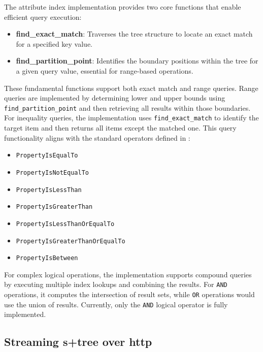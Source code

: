 The attribute index implementation provides two core functions that enable efficient query execution:

\begin{itemize}
  \item \textbf{find\_exact\_match}: Traverses the tree structure to locate an exact match for a specified key value.
  \item \textbf{find\_partition\_point}: Identifies the boundary positions within the tree for a given query value, essential for range-based operations.
\end{itemize}

These fundamental functions support both exact match and range queries. Range queries are implemented by determining lower and upper bounds using \texttt{find\_partition\_point} and then retrieving all results within those boundaries. For inequality queries, the implementation uses \texttt{find\_exact\_match} to identify the target item and then returns all items except the matched one. This query functionality aligns with the standard operators defined in \citet{ogc_filter_encoding_2010}:

\begin{itemize}
  \item \texttt{PropertyIsEqualTo}
  \item \texttt{PropertyIsNotEqualTo}
  \item \texttt{PropertyIsLessThan}
  \item \texttt{PropertyIsGreaterThan}
  \item \texttt{PropertyIsLessThanOrEqualTo}
  \item \texttt{PropertyIsGreaterThanOrEqualTo}
  \item \texttt{PropertyIsBetween}
\end{itemize}

For complex logical operations, the implementation supports compound queries by executing multiple index lookups and combining the results. For \texttt{AND} operations, it computes the intersection of result sets, while \texttt{OR} operations would use the union of results. Currently, only the \texttt{AND} logical operator is fully implemented.

\subsection{Streaming \texorpdfstring{\ac{s+tree}}{S+tree} over \texorpdfstring{\ac{http}}{HTTP}}
\label{methodology:attribute_index:streaming_s_tree}

